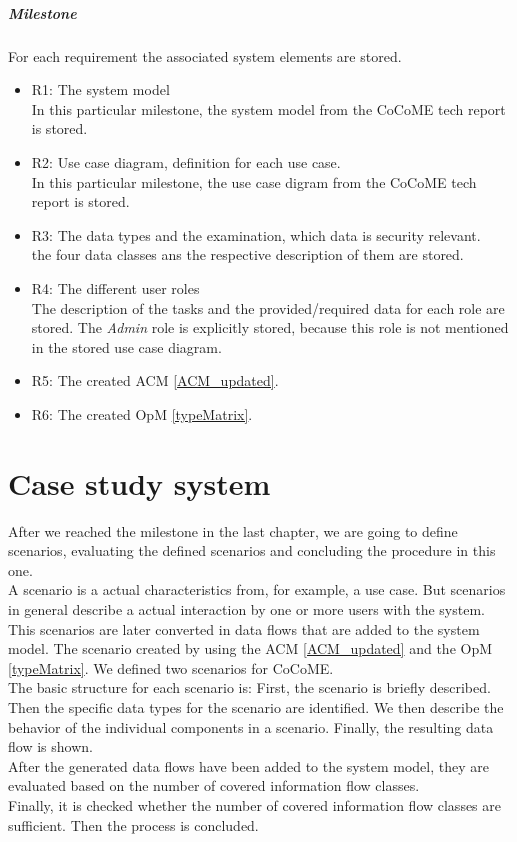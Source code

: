 \paragraph{Milestone}
For each requirement the associated system elements are stored.
\begin{itemize}
\item R1: The system model\\ In this particular milestone, the system model from the CoCoME tech report \cite{CoCoMETechReport} is stored.
\item R2: Use case diagram, definition for each use case.\\  In this particular milestone, the use case digram from the CoCoME tech report \cite{CoCoMETechReport} is stored.
\item R3: The data types and the examination, which data is security relevant. \\ the four data classes ans the respective description of them are stored.
\item R4: The different user roles\\ The description of the tasks and the provided/required data for each role are stored. The \textit{Admin} role is explicitly stored, because this role is not mentioned in the stored use case diagram.
\item R5: The created ACM \autoref{ACM_updated}.
\item R6: The created OpM \autoref{typeMatrix}.
\end{itemize}
\chapter{Case study system}
\label{ch:casestudysystem}
After we reached the milestone in the last chapter, we are going to define scenarios, evaluating the defined scenarios and concluding the procedure in this one.\\
A scenario is a actual characteristics from, for example, a use case. But scenarios in general describe a actual interaction by one or more users with the system. This scenarios are later converted in data flows that are added to the system model. The scenario created by using the ACM \autoref{ACM_updated} and the OpM \autoref{typeMatrix}. We defined two scenarios for CoCoME.\\ The basic structure for each scenario is: First, the scenario is briefly described. Then the specific data types for the scenario are identified. We then describe the behavior of the individual components in a scenario. Finally, the resulting data flow is shown. \\
After the generated data flows have been added to the system model, they are evaluated based on the number of covered information flow classes. \\
Finally, it is checked whether the number of covered information flow classes are sufficient. Then the process is concluded.
